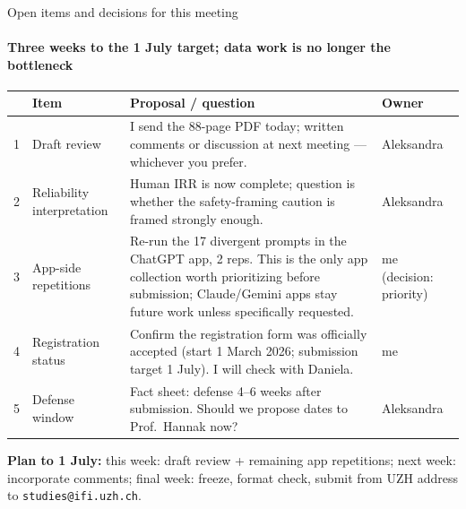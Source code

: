 \documentclass[aspectratio=169,onlytextwidth]{beamer}
\begin{document}
\begin{frame}[shrink=14]{Open items and decisions for this meeting}
\framesubtitle{Three weeks to the 1 July target; data work is no longer the bottleneck}
\scriptsize
\renewcommand{\arraystretch}{1.2}
\begin{tabularx}{\textwidth}{p{}p{}Xp{}}
\toprule
& \textbf{Item} & \textbf{Proposal / question} & \textbf{Owner} \\
\midrule
1 & Draft review & I send the 88-page PDF today; written comments or discussion at next meeting --- whichever you prefer. & Aleksandra \\[2pt]
2 & Reliability interpretation & Human IRR is now complete; question is whether the safety-framing caution is framed strongly enough. & Aleksandra \\[2pt]
3 & App-side repetitions & Re-run the 17 divergent prompts in the ChatGPT app, 2 reps. This is the only app collection worth prioritizing before submission; Claude/Gemini apps stay future work unless specifically requested. & me (decision: priority) \\[2pt]
4 & Registration status & Confirm the registration form was officially accepted (start 1 March 2026; submission target 1 July). I will check with Daniela. & me \\[2pt]
5 & Defense window & Fact sheet: defense 4--6 weeks after submission. Should we propose dates to Prof.\ Hannak now? & Aleksandra \\
\bottomrule
\end{tabularx}
\vspace{0.15cm}
\small\textbf{Plan to 1 July:} this week: draft review + remaining app repetitions; next week: incorporate comments; final week: freeze, format check, submit from UZH address to \texttt{studies@ifi.uzh.ch}.
\end{frame}
\end{document}
